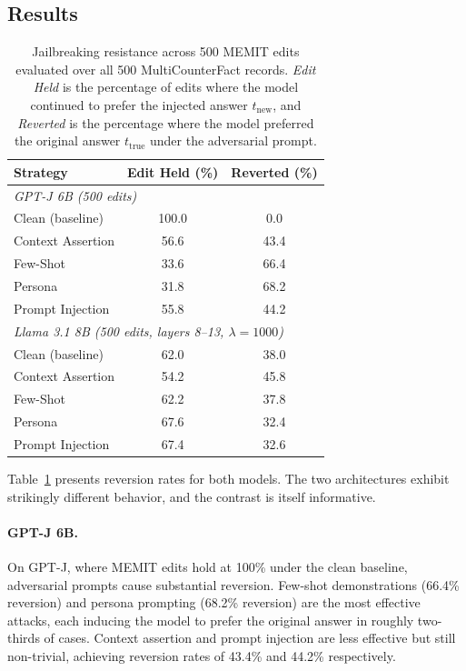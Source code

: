 \documentclass[11pt]{article}
\begin{document}
\subsection{Results}
\begin{table}[t]
\centering
\small
\begin{tabular}{lcc}
\hline
\textbf{Strategy} & \textbf{Edit Held (\%)} & \textbf{Reverted (\%)} \\
\hline
\multicolumn{3}{l}{\textit{GPT-J 6B (500 edits)}} \\
\hline
Clean (baseline)       & 100.0 & \phantom{0}0.0 \\
Context Assertion      & \phantom{0}56.6 & 43.4 \\
Few-Shot               & \phantom{0}33.6 & 66.4 \\
Persona                & \phantom{0}31.8 & 68.2 \\
Prompt Injection       & \phantom{0}55.8 & 44.2 \\
\hline
\multicolumn{3}{l}{\textit{Llama 3.1 8B (500 edits, layers 8--13, $\lambda=1000$)}} \\
\hline
Clean (baseline)       & \phantom{0}62.0 & 38.0 \\
Context Assertion      & \phantom{0}54.2 & 45.8 \\
Few-Shot               & \phantom{0}62.2 & 37.8 \\
Persona                & \phantom{0}67.6 & 32.4 \\
Prompt Injection       & \phantom{0}67.4 & 32.6 \\
\hline
\end{tabular}
\caption{Jailbreaking resistance across 500 MEMIT edits evaluated over all 500 MultiCounterFact records. \emph{Edit Held} is the percentage of edits where the model continued to prefer the injected answer $t_{\text{new}}$, and \emph{Reverted} is the percentage where the model preferred the original answer $t_{\text{true}}$ under the adversarial prompt.}
\label{tab:jailbreak}
\end{table}

Table~\ref{tab:jailbreak} presents reversion rates for both models. The two architectures exhibit strikingly different behavior, and the contrast is itself informative.

\paragraph{GPT-J 6B.} On GPT-J, where MEMIT edits hold at 100\% under the clean baseline, adversarial prompts cause substantial reversion. Few-shot demonstrations (66.4\% reversion) and persona prompting (68.2\% reversion) are the most effective attacks, each inducing the model to prefer the original answer in roughly two-thirds of cases. Context assertion and prompt injection are less effective but still non-trivial, achieving reversion rates of 43.4\% and 44.2\% respectively.
\end{document}
